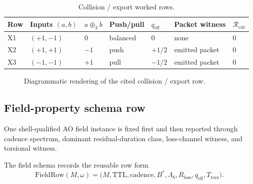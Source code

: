 \begin{table}[H]
\centering
\caption{Collision / export worked rows.}
\label{tab:manual-collision-export}
\begin{threeparttable}
\small
\begin{tabular}{@{}lllllll@{}}
\toprule
Row & Inputs $(a,b)$ & $a\oplus_3 b$ & Push/pull & $q_{\mathrm{eff}}$ & Packet witness & $\mathcal R_{\mathrm{cut}}$ \\
\midrule
X1 & $(+1,-1)$ & $0$ & balanced & $0$ & none & $0$ \\
X2 & $(+1,+1)$ & $-1$ & push & $+1/2$ & emitted packet & $0$ \\
X3 & $(-1,-1)$ & $+1$ & pull & $-1/2$ & emitted packet & $0$ \\
\bottomrule
\end{tabular}
\end{threeparttable}
\end{table}

\begin{figure}[H]
\centering
{}
\caption{Diagrammatic rendering of the cited collision / export row.}
\label{fig:manual-shared-collision-export}
\end{figure}

\subsection{Field-property schema row}
\label{man:field-property-schema-row}
One shell-qualified AO field instance is fixed first and then reported through cadence spectrum, dominant residual-duration class, loss-channel witness, and torsional witness.\par\smallskip
{}

The field schema records the reusable row form
\[
\mathrm{FieldRow}(M,\omega)=
\bigl(M,\mathrm{TTL},\mathrm{cadence},B^*,\Lambda_b,R_{\mathrm{loss}},q_{\mathrm{eff}},T_{\mathrm{tors}}\bigr).
\]

